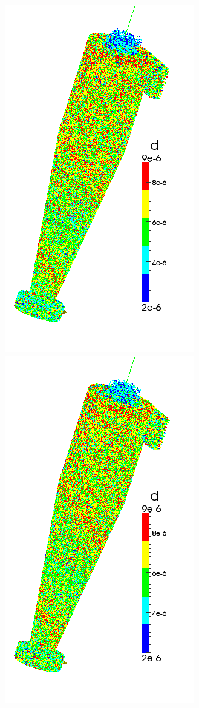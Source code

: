 \begin{figure}[h]
\begin{minipage}{0.2\linewidth}
	\end{minipage}
		\hspace{-1em}
	\begin{minipage}{0.2\linewidth}
		\includegraphics[scale=0.3]{t8}
	\end{minipage}
		\hspace{-1em}
	\begin{minipage}{0.2\linewidth}
		\includegraphics[scale=0.3]{t9}

\end{minipage}
\end{figure}
